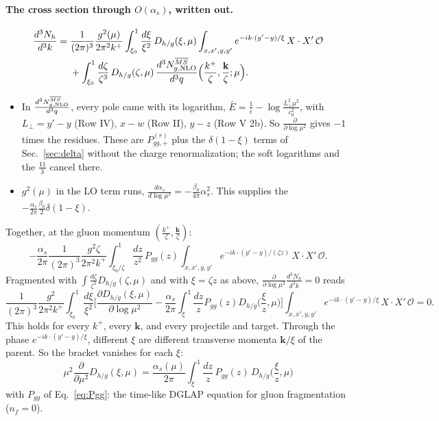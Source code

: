 \documentclass[10pt]{article}
\numberwithin{equation}{section}
\newcommand{\OO}{\mathcal O}
\newcommand{\pre}{\frac{1}{(2\pi)^3}\frac{g^2}{2\pi^2k^+}}
\begin{document}
\paragraph{The cross section through $O(\alpha_s)$, written out.}
\begin{align}
\frac{d^3N_h}{d^3k}={}&\frac{1}{(2\pi)^3}\frac{g^2(\mu)}{2\pi^2k^+}\int_{\xi_0}^1\frac{d\xi}{\xi^2}\,D_{h/g}(\xi,\mu)\int_{x,x',y,y'}e^{-ik\cdot(y'-y)/\xi}\,X\cdot X'\,\OO\notag\\
&+\int_{\xi_0}^1\frac{d\zeta}{\zeta^3}\,D_{h/g}(\zeta,\mu)\,\frac{d^3N^{\overline{MS}}_{g,\rm NLO}}{d^3q}\Big(\frac{k^+}{\zeta},\frac{\mathbf k}{\zeta};\mu\Big).
\end{align}
\begin{itemize}
\item In $\frac{d^3N^{\overline{MS}}_{g,\rm NLO}}{d^3q}$, every pole came with its logarithm, $\bar E=\frac1{\bar\epsilon}-\log\frac{L_\perp^2\mu^2}{c_0^2}$, with $L_\perp=y'-y$ (Row IV), $x-w$ (Row II), $y-z$ (Row V 2b). So $\frac{\partial}{\partial\log\mu^2}$ gives $-1$ times the residues. These are $P^{(r)}_{gg,+}$ plus the $\delta(1-\xi)$ terms of Sec.~\ref{sec:delta} without the charge renormalization; the soft logarithms and the $\frac{11}{3}$ cancel there.
\item $g^2(\mu)$ in the LO term runs, $\frac{d\alpha_s}{d\log\mu^2}=-\frac{\beta_0}{4\pi}\alpha_s^2$. This supplies the $-\frac{\alpha_s}{2\pi}\frac{\beta_0}{2}\delta(1-\xi)$.
\end{itemize}
Together, at the gluon momentum $(\frac{k^+}{\zeta},\frac{\mathbf k}{\zeta})$:
\begin{equation*}
-\frac{\alpha_s}{2\pi}\frac{1}{(2\pi)^3}\frac{g^2\zeta}{2\pi^2k^+}\int_{\xi_0/\zeta}^1\frac{dz}{z^2}\,P_{gg}(z)\int_{x,x',y,y'}e^{-ik\cdot(y'-y)/(\zeta z)}\,X\cdot X'\,\OO .
\end{equation*}
Fragmented with $\int\frac{d\zeta}{\zeta^3}D_{h/g}(\zeta,\mu)$ and with $\xi=\zeta z$ as above, $\frac{\partial}{\partial\log\mu^2}\frac{d^3N_h}{d^3k}=0$ reads
\begin{equation}
\pre\int_{\xi_0}^1\frac{d\xi}{\xi^2}\Big[\frac{\partial D_{h/g}(\xi,\mu)}{\partial\log\mu^2}-\frac{\alpha_s}{2\pi}\int_\xi^1\frac{dz}{z}P_{gg}(z)D_{h/g}\Big(\frac{\xi}{z},\mu\Big)\Big]\int_{x,x',y,y'}e^{-ik\cdot(y'-y)/\xi}\,X\cdot X'\,\OO=0 .
\end{equation}
This holds for every $k^+$, every $\mathbf k$, and every projectile and target. Through the phase $e^{-ik\cdot(y'-y)/\xi}$, different $\xi$ are different transverse momenta $\mathbf k/\xi$ of the parent. So the bracket vanishes for each $\xi$:
\begin{equation}
\boxed{\mu^2\frac{\partial}{\partial\mu^2}D_{h/g}(\xi,\mu)=\frac{\alpha_s(\mu)}{2\pi}\int_\xi^1\frac{dz}{z}\,P_{gg}(z)\,D_{h/g}\Big(\frac{\xi}{z},\mu\Big)}
\label{eq:DGLAP}
\end{equation}
with $P_{gg}$ of Eq.~\eqref{eq:Pgg}: the time-like DGLAP equation for gluon fragmentation ($n_f=0$).
\end{document}
